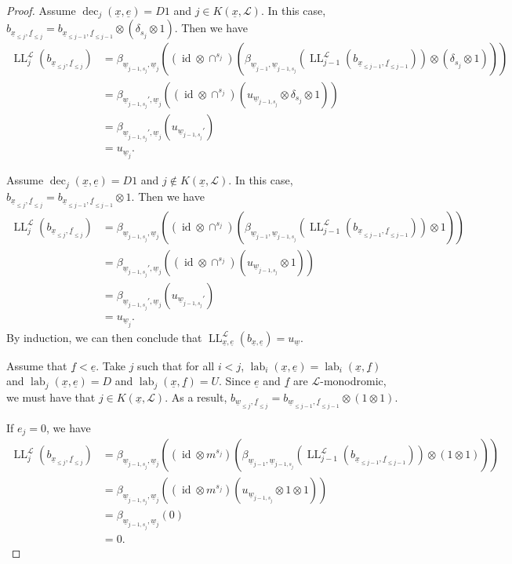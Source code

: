\documentclass[10pt,a4paper]{amsart}
\DeclareMathOperator{\LL}{LL}
\DeclareMathOperator{\dec}{dec}
\DeclareMathOperator{\id}{id}
\DeclareMathOperator{\lab}{lab}
\newcommand{\scrL}{\mathcal{L}}
\newcommand{\ue}{\underline{e}}
\newcommand{\uf}{\underline{f}}
\newcommand{\uw}{\underline{w}}
\newcommand{\ux}{\underline{x}}
\begin{document}
\begin{proof}
    Assume $\dec_j (\ux, \ue) = D1$ and $j \in K(\ux, \scrL)$. In this case, $b_{\ux_{\leq j}, \uf_{\leq j}} = b_{\ux_{\leq j-1}, \uf_{\leq j-1}} \otimes (\delta_{s_j} \otimes 1)$.
    Then we have
    \begin{align*}
        \LL_j^{\scrL} (b_{\ux_{\leq j}, \uf_{\leq j}}) &= \beta_{\uw_{j-1,s_j}, \uw_j} \left( (\id \otimes \cap^{s_j}) \left( \beta_{\uw_{j-1}, \uw_{j-1,s_j}} \left( \LL_{j-1}^{\scrL} (b_{\ux_{\leq j-1}, \uf_{\leq j-1}}) \right) \otimes (\delta_{s_j} \otimes 1) \right) \right) \\
        &= \beta_{\uw_{j-1,s_j}', \uw_j} \left( (\id \otimes \cap^{s_j}) \left( u_{\uw_{j-1,s_j}} \otimes \delta_{s_j} \otimes 1 \right) \right) \\
        &= \beta_{\uw_{j-1,s_j}', \uw_j} \left( u_{\uw_{j-1,s_j}'}\right) \\
        &= u_{\uw_j}.
    \end{align*}

    Assume $\dec_j (\ux, \ue) = D1$ and $j \notin K(\ux, \scrL)$. In this case, $b_{\ux_{\leq j}, \uf_{\leq j}} = b_{\ux_{\leq j-1}, \uf_{\leq j-1}} \otimes 1$.
    Then we have
    \begin{align*}
        \LL_j^{\scrL} (b_{\ux_{\leq j}, \uf_{\leq j}}) &= \beta_{\uw_{j-1,s_j}, \uw_j} \left( (\id \otimes \cap^{s_j}) \left( \beta_{\uw_{j-1}, \uw_{j-1,s_j}} \left( \LL_{j-1}^{\scrL} (b_{\ux_{\leq j-1}, \uf_{\leq j-1}}) \right) \otimes 1 \right) \right) \\
        &= \beta_{\uw_{j-1,s_j}', \uw_j} \left( (\id \otimes \cap^{s_j}) \left( u_{\uw_{j-1,s_j}} \otimes 1 \right) \right) \\
        &= \beta_{\uw_{j-1,s_j}', \uw_j} \left( u_{\uw_{j-1,s_j}'}\right) \\
        &= u_{\uw_j}.
    \end{align*}
    By induction, we can then conclude that $\LL_{\ux, \ue}^{\scrL} (b_{\ux, \ue}) = u_{\uw}$.

    Assume that $\uf < \ue$. Take $j$ such that for all $i < j$, $\lab_i (\ux, \ue) = \lab_i (\ux, \uf)$ and $\lab_j (\ux, \ue) = D$ and $\lab_j (\ux, \uf) = U$.
    Since $\ue$ and $\uf$ are $\scrL$-monodromic, we must have that $j \in K(\ux, \scrL)$. As a result, $b_{\uw_{\leq j}, \uf_{\leq j}} = b_{\uw_{\leq j-1}, \uf_{\leq j -1 }} \otimes (1 \otimes 1)$.

    If $e_j = 0$, we have
    \begin{align*}
        \LL_j^{\scrL} (b_{\ux_{\leq j}, \uf_{\leq j}}) &= \beta_{\uw_{j-1,s_j}, \uw_j} \left( (\id \otimes m^{s_j}) \left( \beta_{\uw_{j-1}, \uw_{j-1,s_j}} \left( \LL_{j-1}^{\scrL} (b_{\ux_{\leq j-1}, \uf_{\leq j-1}}) \right) \otimes (1 \otimes 1) \right) \right) \\
        &= \beta_{\uw_{j-1,s_j}, \uw_j} \left( (\id \otimes m^{s_j}) \left( u_{\uw_{j-1,s_j}} \otimes 1 \otimes 1 \right) \right) \\
        &= \beta_{\uw_{j-1,s_j}, \uw_j} \left( 0\right) \\
        &= 0.
    \end{align*}


\end{proof}
\end{document}
